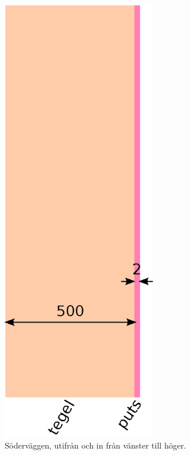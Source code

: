 \begin{figure}[hpbt]
\centering
\includegraphics[width=0.6\textwidth]{images/sodervagg.eps}
\caption{\label{fig:sodervagg}{Söderväggen, utifrån och in från vänster till höger.}}
\end{figure}

